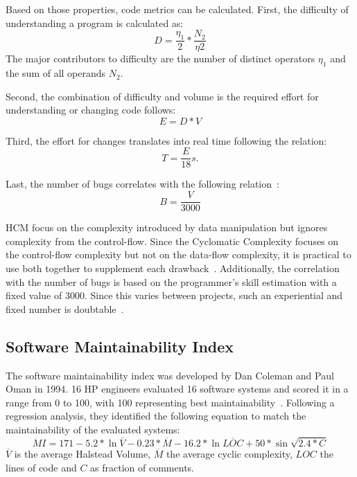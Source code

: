 Based on those properties, code metrics can be calculated. 
First, the difficulty of understanding a program is calculated as:
\begin{displaymath}
    D = \frac{\eta_1}{2} * \frac{N_2}{\eta2}
\end{displaymath}
The major contributors to difficulty are the number of distinct operators $\eta_1$ and the sum of all operands $N_2$.

Second, the combination of difficulty and volume is the required effort for understanding or changing code follows:
\begin{displaymath}
    E = D * V
\end{displaymath}

Third, the effort for changes translates into real time following the relation:
\begin{displaymath}
    T = \frac{E}{18}s.
\end{displaymath}

Last, the number of bugs correlates with the following relation~\cite{yu_survey_2010}:
\begin{displaymath}
    B = \frac{V}{3000}
\end{displaymath}

HCM focus on the complexity introduced by data manipulation but ignores complexity from the control-flow. Since the Cyclomatic Complexity focuses on the control-flow complexity but not on the data-flow complexity, it is practical to use both together to supplement each drawback~\cite{yu_survey_2010}.
Additionally, the correlation with the number of bugs is based on the programmer's skill estimation with a fixed value of 3000. Since this varies between projects, such an experiential and fixed number is doubtable~\cite{yu_survey_2010}.

\subsection{Software Maintainability Index}
The software maintainability index was developed by Dan Coleman and Paul Oman in 1994. 16 HP engineers evaluated 16 software systems and scored it in a range from 0 to 100, with 100 representing best maintainability~\cite{coleman_using_1994}. 
Following a regression analysis, they identified the following equation to match the maintainability of the evaluated systems:
\begin{displaymath}
MI = 171 - 5.2 *\ln{\overline{V}} - 0.23 * \overline{M} - 16.2 * \ln{\overline{LOC}} + 50 * \sin{\sqrt{2.4 * C}}
\end{displaymath}
$\overline{V}$ is the average Halstead Volume, $\overline{M}$ the average cyclic complexity, $LOC$ the lines of code and $C$ as fraction of comments.


